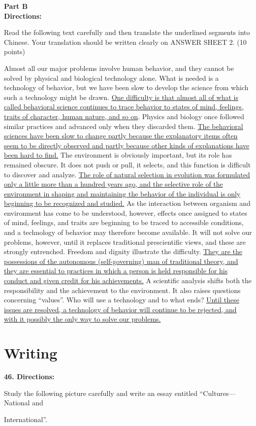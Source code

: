 \newpage
\noindent
\textbf{Part B}\\
\textbf{Directions:}\\
{Read the following text carefully and then translate the
	underlined segments into Chinese. Your translation should be written
	clearly on ANSWER SHEET 2. (10 points)

\TiGanSpace

Almost all our major problems involve human behavior, and they cannot be
solved by physical and biological technology alone. What is needed is a
technology of behavior, but we have been slow to develop the science
from which such a technology might be drawn. \transnum \uline{One
	difficulty is that almost all of what is called behavioral science
	continues to trace behavior to states of mind, feelings, traits of
	character, human nature, and so on}. Physics and biology once followed
similar practices and advanced only when they discarded them. \transnum \uline{The behavioral sciences have been slow to change partly
	because the explanatory items often seem to be directly observed and
	partly because other kinds of explanations have been hard to find.} The
environment is obviously important, but its role has remained obscure.
It does not push or pull, it selects, and this function is
difficult to discover and analyze. \transnum \uline{The role of natural
	selection in evolution was formulated only a little more than a hundred
	years ago, and the selective role of the environment in shaping and
	maintaining the behavior of the individual is only beginning to be
	recognized and studied.} As the interaction between organism and
environment has come to be understood, however, effects once assigned to
states of mind, feelings, and traits are beginning to be traced to
accessible conditions, and a technology of behavior may therefore become
available. It will not solve our problems, however, until it replaces
traditional prescientific views, and these are strongly entrenched.
Freedom and dignity illustrate the difficulty.  \transnum \uline{They are
	the possessions of the autonomous (self-governing) man of traditional
	theory, and they are essential to practices in which a person is held
	responsible for his conduct and given credit for his achievements.} A
scientific analysis shifts both the responsibility and the achievement
to the environment. It also raises questions concerning ``values''. Who
will use a technology and to what ends?  \transnum \uline{Until these
	issues are resolved, a technology of behavior will continue to be
	rejected, and with it possibly the only way to solve our problems.}



\section{Writing}



\noindent
\textbf{46. Directions:}

Study the following picture carefully and write an essay 
entitled ``Cultures---National and} International''.
